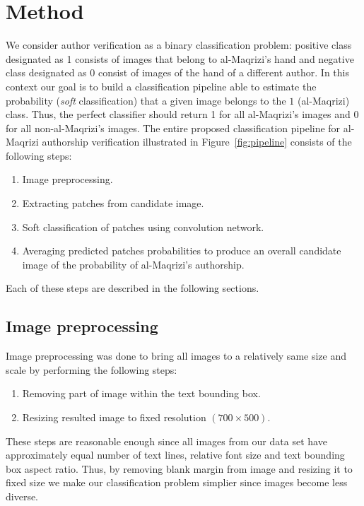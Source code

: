 \documentclass[conference,a4paper]{ieeetran}
\begin{document}

\section{Method}
\label{sec:the_method}

We consider author verification as a binary classification problem: positive class designated as 1 consists of images that belong to al-Maqrizi's hand and negative class designated as 0 consist of images of the hand of a different author. In this context our goal is to build a classification pipeline able to estimate the probability (\textit{soft} classification) that a given image belongs to the $1$ (al-Maqrizi) class. Thus, the perfect classifier should return 1 for all al-Maqrizi's images and 0 for all non-al-Maqrizi's images. The entire proposed classification pipeline for al-Maqrizi authorship verification illustrated in Figure~\ref{fig:pipeline} consists of the following steps:

\begin{enumerate}
	\item Image preprocessing.
	\item Extracting patches from candidate image.
	\item Soft classification of patches using convolution network.
	\item Averaging predicted patches probabilities to produce an overall candidate image of the probability of al-Maqrizi's authorship.
\end{enumerate}

Each of these steps are described in the following sections.	


\subsection{Image preprocessing}
Image preprocessing was done to bring all images to a relatively same size and scale by performing the following steps:
\begin{enumerate}
	\item Removing part of image within the text bounding box.
	\item Resizing resulted image to fixed resolution $(700\times 500)$.
\end{enumerate}
These steps are reasonable enough since all images from our data set have approximately equal number of text lines, relative font size and text bounding box aspect ratio. Thus, by removing blank margin from image and resizing it to fixed size we make our classification problem simplier since images become less diverse. 
\end{document}
